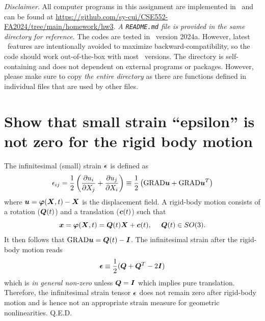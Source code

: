 \pagestyle{fancy}
\setlength{\headheight}{16pt}
\fancyhead{} %
\fancyfoot{} %
\fancyfoot[C]{\thepage}

\newcommand{\Fint}{\ensuremath{\bv{F}^{\textrm{int}}}}
\newcommand{\Fext}{\ensuremath{\bv{F}^{\textrm{ext}}}}

\noindent \emph{Disclaimer}. All computer programs in this assignment are implemented in \matlab~and can be found at \url{https://github.com/sy-cui/CSE552-FA2024/tree/main/homework/hw3}. 
\emph{A \texttt{README.md} file is provided in the same directory for reference}. 
The codes are tested in \matlab~version 2024a. 
However, latest \matlab~features are intentionally avoided to maximize backward-compatibility, so the code should work out-of-the-box with most \matlab~versions. 
The directory is self-containing and does not dependent on external programs or packages. 
However, please make sure to copy \emph{the entire directory} as there are functions defined in individual files that are used by other files. 

\section{Show that small strain ``epsilon'' is not zero for the rigid body motion}
The infinitesimal (small) strain $\bm{\epsilon}$ is defined as 
\begin{equation}
    \epsilon_{ij} = \frac{1}{2}\left(\frac{\partial u_i}{\partial X_j} + \frac{\partial u_j}{\partial X_i}\right) \equiv \frac{1}{2}\left(\textrm{GRAD} \bm{u} + \textrm{GRAD} \bm{u}^T\right)
\end{equation}
where $\bm{u} = \bm{\varphi}(\bm{X}, t) - \bm{X}$ is the displacement field.
A rigid-body motion consists of a rotation ($\bm{Q}(t)$) and a translation ($\bm{c}(t)$) such that 
\begin{equation}\label{eqn:hw3_p1_rigid}
    \bm{x} = \bm{\varphi}(\bm{X}, t) = \bm{Q}(t) \bm{X} + \bm{c}(t), ~~~~ \bm{Q}(t)\in SO(3).
\end{equation}
It then follows that $\textrm{GRAD}\bm{u} = \bm{Q}(t) - \bm{I}$. 
The infinitesimal strain after the rigid-body motion reads
\begin{equation}
    \bm{\epsilon} \equiv \frac{1}{2}(\bm{Q} + \bm{Q}^T - 2\bm{I})
\end{equation}
which is \emph{in general non-zero} unless $\bm{Q} = \bm{I}$ which implies pure translation.
Therefore, the infinitesimal strain tensor $\bm{\epsilon}$ does not remain zero after rigid-body motion and is hence not an appropriate strain measure for geometric nonlinearities. Q.E.D.

